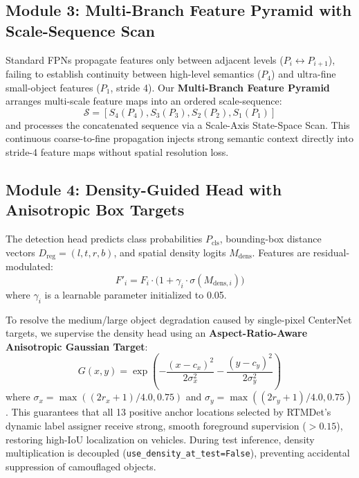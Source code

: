 \documentclass[12pt,a4paper]{report}
\begin{document}
\subsection{Module 3: Multi-Branch Feature Pyramid with Scale-Sequence Scan}
Standard FPNs propagate features only between adjacent levels ($P_i \leftrightarrow P_{i+1}$), failing to establish continuity between high-level semantics ($P_4$) and ultra-fine small-object features ($P_1$, stride 4). Our \textbf{Multi-Branch Feature Pyramid} arranges multi-scale feature maps into an ordered scale-sequence:
\begin{equation}
    \mathcal{S} = [S_4(P_4), S_3(P_3), S_2(P_2), S_1(P_1)]
\end{equation}
and processes the concatenated sequence via a Scale-Axis State-Space Scan. This continuous coarse-to-fine propagation injects strong semantic context directly into stride-4 feature maps without spatial resolution loss.

\subsection{Module 4: Density-Guided Head with Anisotropic Box Targets}
The detection head predicts class probabilities $P_{\text{cls}}$, bounding-box distance vectors $D_{\text{reg}} = (l, t, r, b)$, and spatial density logits $M_{\text{dens}}$. Features are residual-modulated:
\begin{equation}
    F'_i = F_i \cdot \big(1 + \gamma_i \cdot \sigma(M_{\text{dens}, i})\big)
\end{equation}
where $\gamma_i$ is a learnable parameter initialized to 0.05. 

To resolve the medium/large object degradation caused by single-pixel CenterNet targets, we supervise the density head using an \textbf{Aspect-Ratio-Aware Anisotropic Gaussian Target}:
\begin{equation}
    G(x, y) = \exp\left( - \frac{(x - c_x)^2}{2 \sigma_x^2} - \frac{(y - c_y)^2}{2 \sigma_y^2} \right)
\end{equation}
where $\sigma_x = \max((2r_x + 1)/4.0, 0.75)$ and $\sigma_y = \max((2r_y + 1)/4.0, 0.75)$. This guarantees that all 13 positive anchor locations selected by RTMDet's dynamic label assigner receive strong, smooth foreground supervision ($>0.15$), restoring high-IoU localization on vehicles. During test inference, density multiplication is decoupled (\texttt{use\_density\_at\_test=False}), preventing accidental suppression of camouflaged objects.
\end{document}

